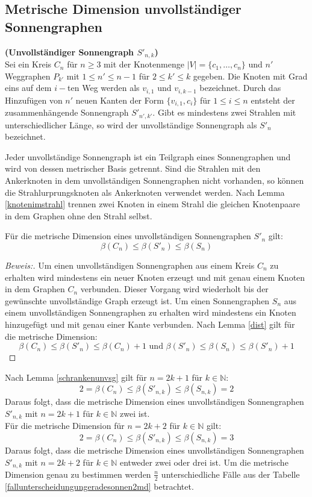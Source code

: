 \subsection{Metrische Dimension unvollständiger Sonnengraphen}  	
\label{chap_usonne} 
\begin{defi}{\textbf{(Unvollständiger Sonnengraph $S'_{n,k}$)}}\\
Sei ein Kreis $C_n$ für $n \geq 3$ mit der Knotenmenge $|V|=\{ c_1, \ldots , c_n \}$ und $n'$ Weggraphen $P_{k'}$ mit $1 \leq n' \leq n-1$ für $2 \leq k' \leq k$ gegeben. Die Knoten mit Grad eins auf dem $i-$ten Weg werden als $v_{i,1}$ und $v_{i,k-1}$ bezeichnet. Durch das Hinzufügen von $n'$ neuen Kanten der Form $\{v_{i,1},c_i\}$ für $1 \leq i \leq n$ entsteht der zusammenhängende Sonnengraph $S'_{n',k'}$. Gibt es mindestens zwei Strahlen mit unterschiedlicher Länge, so wird der unvollständige Sonnengraph als $S'_n$ bezeichnet. 
\end{defi}
\begin{bem}
\label{bemsonne}
Jeder unvollständige Sonnengraph ist ein Teilgraph eines Sonnengraphen und wird von dessen metrischer Basis getrennt. Sind die Strahlen mit den Ankerknoten in dem unvollständigen Sonnengraphen nicht vorhanden, so können die Strahlurprungsknoten als Ankerknoten verwendet werden. Nach Lemma \ref{knotenimstrahl} trennen zwei Knoten in einem Strahl die gleichen Knotenpaare in dem Graphen ohne den Strahl selbst.
\end{bem}
\begin{lem}
\label{schrankenunvsg}
Für die metrische Dimension eines unvollständigen Sonnengraphen $S'_{n}$ gilt:
$$\beta(C_n) \leq \beta(S'_{n})\leq \beta(S_{n})$$
\end{lem}
\begin{proof}[Beweis:]
Um einen unvollständigen Sonnengraphen aus einem Kreis $C_n$ zu erhalten wird mindestens ein neuer Knoten erzeugt und mit genau einem Knoten in dem Graphen $C_n$ verbunden. Dieser Vorgang wird wiederholt bis der gewünschte unvollständige Graph erzeugt ist. Um einen Sonnengraphen $S_{n}$ aus einem unvollständigen Sonnengraphen zu erhalten wird mindestens ein Knoten hinzugefügt und mit genau einer Kante verbunden. Nach Lemma \ref{dist} gilt für die metrische Dimension:
$$\beta(C_n)  \leq \beta(S'_{n}) \leq \beta(C_n) +1 \text{ und } \beta(S'_{n}) \leq \beta(S_n) \leq \beta(S'_{n})+1$$
\end{proof}
\begin{bem}
Nach Lemma \ref{schrankenunvsg} gilt für $n=2k+1$ für $k \in \mathbb{N}$: $$2=\beta(C_n) \leq \beta(S'_{n,k})\leq \beta(S_{n,k})=2$$
Daraus folgt, dass die metrische Dimension eines unvollständigen Sonnengraphen $S'_{n,k}$ mit $n=2k+1$ für $k \in \mathbb{N}$ zwei ist.\\
Für die metrische Dimension für $n=2k+2$ für $k \in \mathbb{N}$ gilt: $$2=\beta(C_n) \leq \beta(S'_{n,k})\leq \beta(S_{n,k})=3$$
Daraus folgt, dass die metrische Dimension eines unvollständigen Sonnengraphen $S'_{n,k}$ mit $n=2k+2$ für $k \in \mathbb{N}$ entweder zwei oder drei ist. Um die metrische Dimension genau zu bestimmen werden $\frac{n}{2}$ unterschiedliche Fälle aus der Tabelle \ref{fallunterscheidungungeradesonnen2md} betrachtet.
\end{bem}
